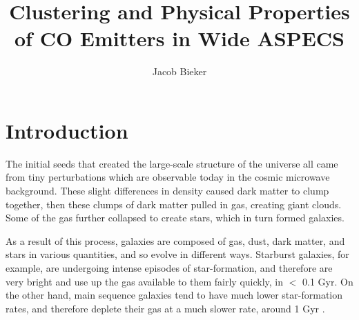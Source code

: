 \documentclass[twoside,single]{lion-msc}
\title{Clustering and Physical Properties of CO Emitters in Wide ASPECS}
\author{Jacob Bieker}
\affiliation{Leiden Observatory, Leiden University}
\begin{document}
\maketitle

\setcounter{page}{2}
\tableofcontents
\cleardoublepage

\setcounter{page}{1}
\chapter{Introduction}






The initial seeds that created the large-scale structure of the universe all came from tiny perturbations which are observable today in the cosmic microwave background. These slight differences in density caused dark matter to clump together, then these clumps of dark matter pulled in gas, creating giant clouds. Some of the gas further collapsed to create stars, which in turn formed galaxies.

As a result of this process, galaxies are composed of gas, dust, dark matter, and stars in various quantities, and so evolve in different ways. Starburst galaxies, for example, are undergoing intense episodes of star-formation, and therefore are very bright and use up the gas available to them fairly quickly, in $<$ 0.1 Gyr. On the other hand, main sequence galaxies tend to have much lower star-formation rates, and therefore deplete their gas at a much slower rate, around 1 Gyr \cite{scoville2017evolution, silverman2015higher}.
\end{document}
